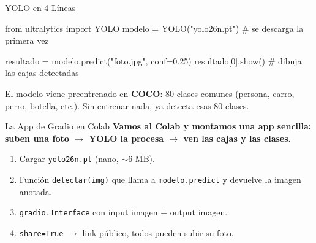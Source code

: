 \documentclass[aspectratio=169, 11pt]{beamer}
\begin{document}
\begin{frame}{YOLO en 4 L\'ineas}
  \vspace{-4pt}
  \begin{pyblock}
from ultralytics import YOLO
modelo = YOLO("yolo26n.pt")           # se descarga la primera vez

resultado = modelo.predict("foto.jpg", conf=0.25)
resultado[0].show()                   # dibuja las cajas detectadas
  \end{pyblock}

  \vspace{4pt}
  {\scriptsize\color{textMuted}
    \faLightbulb\hspace{4pt} El modelo viene preentrenado en
    \textbf{COCO}: 80 clases comunes (persona, carro, perro, botella,
    etc.). Sin entrenar nada, ya detecta esas 80 clases.}
\end{frame}

\begin{frame}[shrink]{La App de Gradio en Colab}
  \vspace{6pt}
  {\footnotesize\color{arcaDark}\bfseries
    Vamos al Colab y montamos una app sencilla:
    suben una foto $\to$ YOLO la procesa $\to$ ven las cajas y las clases.}

  \vspace{12pt}
  {\footnotesize
  \begin{enumerate}\setlength{\itemsep}{6pt}
    \item[{\color{arcaRed}\bfseries 1.}]
      Cargar \texttt{yolo26n.pt} (nano, $\sim$6 MB).
    \item[{\color{arcaRed}\bfseries 2.}]
      Funci\'on \texttt{detectar(img)} que llama a \texttt{modelo.predict}
      y devuelve la imagen anotada.
    \item[{\color{arcaRed}\bfseries 3.}]
      \texttt{gradio.Interface} con input imagen + output imagen.
    \item[{\color{codeGreen}\bfseries 4.}]
      \texttt{share=True} $\to$ link p\'ublico, todos pueden subir su foto.
  \end{enumerate}
  }
\end{frame}
\end{document}
